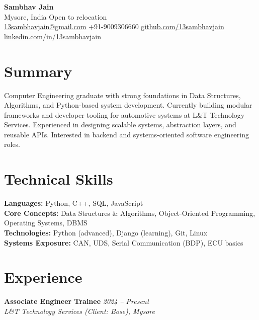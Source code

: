 \documentclass[a4paper,10pt]{article}
\begin{document}
\begin{center}
    {\LARGE \textbf{Sambhav Jain}} \\[4pt]
    Mysore, India \textbar{} Open to relocation \\[2pt]
    \href{mailto:13sambhavjain@gmail.com}{13sambhavjain@gmail.com} \quad
    +91-9009306660 \quad
    \href{https://github.com/13sambhavjain}{github.com/13sambhavjain} \quad
    \href{https://linkedin.com/in/13sambhavjain}{linkedin.com/in/13sambhavjain}
\end{center}

\vspace{2pt}

\section*{Summary}
Computer Engineering graduate with strong foundations in Data Structures, Algorithms, and Python-based system development. Currently building modular frameworks and developer tooling for automotive systems at L\&T Technology Services. Experienced in designing scalable systems, abstraction layers, and reusable APIs. Interested in backend and systems-oriented software engineering roles.

\section*{Technical Skills}
\textbf{Languages:} Python, C++, SQL, JavaScript \\
\textbf{Core Concepts:} Data Structures \& Algorithms, Object-Oriented Programming, Operating Systems, DBMS \\
\textbf{Technologies:} Python (advanced), Django (learning), Git, Linux \\
\textbf{Systems Exposure:} CAN, UDS, Serial Communication (BDP), ECU basics

\section*{Experience}

\noindent
\textbf{Associate Engineer Trainee} \hfill \textit{2024 -- Present} \\
\textit{L\&T Technology Services (Client: Bose), Mysore}
\end{document}
